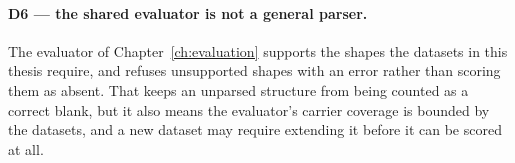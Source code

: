 \paragraph{D6 --- the shared evaluator is not a general parser.}
The evaluator of Chapter~\ref{ch:evaluation} supports the shapes the datasets in this thesis require, and
refuses unsupported shapes with an error rather than scoring them as absent. That keeps an unparsed structure
from being counted as a correct blank, but it also means the evaluator's carrier coverage is bounded by the
datasets, and a new dataset may require extending it before it can be scored at all.

